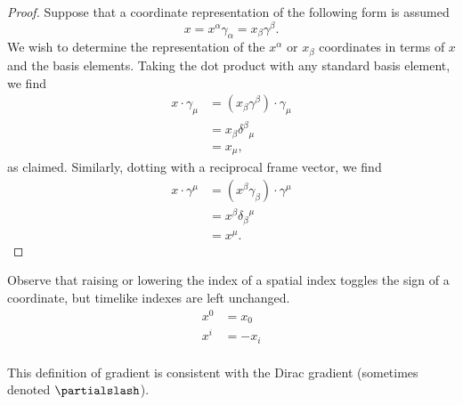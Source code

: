 \begin{proof}
Suppose that a coordinate representation of the following form is assumed
\begin{equation}\label{eqn:lorentzForceCovariant:820}
x = x^\alpha \gamma_\alpha = x_\beta \gamma^\beta.
\end{equation}
We wish to determine the representation of the \( x^\alpha \) or \( x_\beta \) coordinates in terms of \( x\) and the basis elements.  Taking the dot product with any standard basis element, we find
\begin{equation}\label{eqn:lorentzForceCovariant:840}
\begin{aligned}
x \cdot \gamma_\mu
&= (x_\beta \gamma^\beta) \cdot \gamma_\mu \\
&= x_\beta {\delta^\beta}_\mu \\
&= x_\mu,
\end{aligned}
\end{equation}
as claimed.  Similarly, dotting with a reciprocal frame vector, we find
\begin{equation}\label{eqn:lorentzForceCovariant:860}
\begin{aligned}
x \cdot \gamma^\mu
&= (x^\beta \gamma_\beta) \cdot \gamma^\mu \\
&= x^\beta {\delta_\beta}^\mu \\
&= x^\mu.
\end{aligned}
\end{equation}
\end{proof}
Observe that raising or lowering the index of a spatial index toggles the sign of a coordinate, but timelike indexes are left unchanged.
\begin{equation}\label{eqn:lorentzForceCovariant:880}
\begin{aligned}
x^0 &= x_0 \\
x^i &= -x_i \\
\end{aligned}
\end{equation}

This definition of gradient is consistent with the Dirac gradient (sometimes denoted \(\partialslash\)).
%

